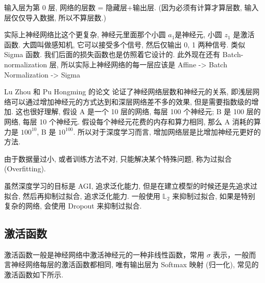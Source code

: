 \documentclass[lang=cn,a4paper,newtx]{elegantpaper}
\begin{document}
\begin{remark}
    输入层为第 0 层, 网络的层数 = 隐藏层+输出层. (因为必须有计算才算层数, 输入层仅仅导入数据, 所以不算层数.)
\end{remark}
\begin{remark}
    实际上神经网络比这个更复杂, 神经元里面那个小圆 $ a_1 $是神经元, 小圆 $ z_1 $ 是激活函数. 大圆叫做感知机, 它可以接受多个信号, 然后仅输出 0, 1 两种信号. 类似 Sigma 函数. 我们后面的损失函数也是仿照着它设计的. 此外现在还有 Batch-normalization 层, 所以实际上神经网络的每一层应该是  Affine -> Batch Normalization -> Sigma 
\end{remark}
\begin{remark}
    Lu Zhou 和 Pu Hongming 的论文 \cite{lu2017expressivepowerneuralnetworks} 论证了神经网络层数和神经元的关系, 即浅层网络可以通过增加神经元的方式达到和深层网络差不多的效果, 但是需要指数级的增加. 这也很好理解, 假设 A 是一个 10 层的网络, 每层 100 个神经元; B 是 100 层的网络, 每层 10 个神经元. 假设每个神经元花费的内存和算力相同, 那么 A 消耗的算力是 $100^{10}$, B 是 $10^{100}$. 所以对于深度学习而言, 增加网络层是比增加神经元更好的方法. 
\end{remark}

\begin{definition}
    由于数据量过小, 或者训练方法不对, 只能解决某个特殊问题, 称为过拟合(Overfitting). 
\end{definition}
\begin{remark}
    虽然深度学习的目标是 AGI, 追求泛化能力, 但是在建立模型的时候还是先追求过拟合, 然后再抑制过拟合, 追求泛化能力. 一般使用 $ \mathbb{L}_{2} $ 来抑制过拟合, 如果是特别复杂的网络, 会使用 Dropout 来抑制过拟合.  
\end{remark}

\subsection{激活函数}
激活函数一般是神经网络中激活神经元的一种非线性函数，常用 $\sigma$ 表示，一般而言神经网络每层的激活函数都相同, 唯有输出层为 Softmax 映射 (归一化), 常见的激活函数如下所示. 
\end{document}
